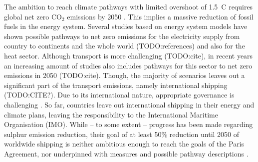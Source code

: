 \documentclass[article]{elsarticle}
\begin{document}
The ambition to reach climate pathways with limited overshoot of 1.5~\degree C requires global net zero CO$_2$ emissions by 2050 \cite{IPCC2018}. This implies a massive reduction of fossil fuels in the energy system. Several studies based on energy system models have shown possible pathways to net zero emissions for the electricity supply from country to continents and the whole world (TODO:references) and also for the heat sector. Although transport is more challenging (TODO:cite), in recent years an increasing amount of studies also includes pathways for this sector to net zero emissions in 2050 (TODO:cite). Though, the majority of scenarios leaves out a significant part of the transport emissions, namely international shipping (TODO:CITE?). Due to its international nature, appropriate governance is challenging \cite{GRITSENKO2017}. So far, countries leave out international shipping in their energy and climate plans, leaving the responsibility to the International Maritime Organisation (IMO). While -- to some extent -- progress has been made regarding sulphur emission reduction, their goal of at least 50\% reduction until 2050 of worldwide shipping \cite{IMO2018} is neither ambitious enough to reach the goals of the Paris Agreement, nor underpinned with measures and possible pathway descriptions \cite{Wan2018}.
\end{document}
